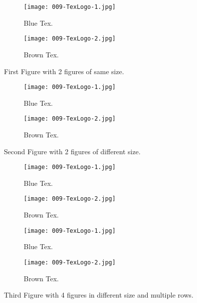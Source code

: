 \documentclass{article}
\begin{document}
	\begin{figure}[h!]
  	\centering
   	\begin{subfigure}[b]{0.4\linewidth}
    	\texttt{[image: 009-TexLogo-1.jpg]}
     	\caption{Blue Tex.}
   	\end{subfigure}
  	\begin{subfigure}[b]{0.4\linewidth}
    	\texttt{[image: 009-TexLogo-2.jpg]}
    	\caption{Brown Tex.}
  	\end{subfigure}
  	\caption{First Figure with 2 figures of same size.}
  	\label{fig:tex1}
	\end{figure}

	\begin{figure}[h!]
  	\centering
  	\begin{subfigure}[b]{0.2\linewidth}
    	\texttt{[image: 009-TexLogo-1.jpg]}
    	\caption{Blue Tex.}
  	\end{subfigure}
    \begin{subfigure}[b]{0.6\linewidth}
    	\texttt{[image: 009-TexLogo-2.jpg]}
    	\caption{Brown Tex.}
  	\end{subfigure}
  	\caption{Second Figure with 2 figures of different size.}
  	\label{fig:tex2}
	\end{figure}

	\begin{figure}[h!]
  	\centering
   	\begin{subfigure}[b]{0.2\linewidth}
    	\texttt{[image: 009-TexLogo-1.jpg]}
     	\caption{Blue Tex.}
   	\end{subfigure}
  	\begin{subfigure}[b]{0.2\linewidth}
    	\texttt{[image: 009-TexLogo-2.jpg]}
    	\caption{Brown Tex.}
  	\end{subfigure}
  	\begin{subfigure}[b]{0.2\linewidth}
    	\texttt{[image: 009-TexLogo-1.jpg]}
    	\caption{Blue Tex.}
  	\end{subfigure}
    \begin{subfigure}[b]{0.5\linewidth}
    	\texttt{[image: 009-TexLogo-2.jpg]}
    	\caption{Brown Tex.}
  	\end{subfigure}
  	\caption{Third Figure with 4 figures in different size and multiple rows.}
  	\label{fig:tex3}
	\end{figure}
\end{document}
